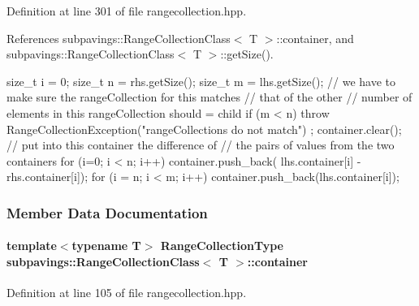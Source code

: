 \-Definition at line 301 of file rangecollection.\-hpp.



\-References subpavings\-::\-Range\-Collection\-Class$<$ T $>$\-::container, and subpavings\-::\-Range\-Collection\-Class$<$ T $>$\-::get\-Size().


\begin{DoxyCode}
        {
            size_t i = 0;
            size_t n = rhs.getSize();
            size_t m = lhs.getSize();
            // we have to make sure the rangeCollection for this matches
            // that of the other
            // number of elements in this rangeCollection should = child
            if (m < n) {
                throw RangeCollectionException("rangeCollections do not match")
      ;
            }
            container.clear();
            // put into this container the difference of
            // the pairs of values from the two containers
            for (i=0; i < n; i++) {
                container.push_back(
                            lhs.container[i] - rhs.container[i]);
            }
            for (i = n; i < m; i++) {
                container.push_back(lhs.container[i]);
            }
        }
\end{DoxyCode}


\subsubsection{\-Member \-Data \-Documentation}
\hypertarget{classsubpavings_1_1RangeCollectionClass_a91c127974a65a450569f9c33bbc2fcf6}{
\paragraph[{container}]{\setlength{\rightskip}{0pt plus 5cm}template$<$typename \-T$>$ {\bf \-Range\-Collection\-Type} {\bf subpavings\-::\-Range\-Collection\-Class}$<$ \-T $>$\-::{\bf container}}}\label{classsubpavings_1_1RangeCollectionClass_a91c127974a65a450569f9c33bbc2fcf6}


\-Definition at line 105 of file rangecollection.\-hpp.



